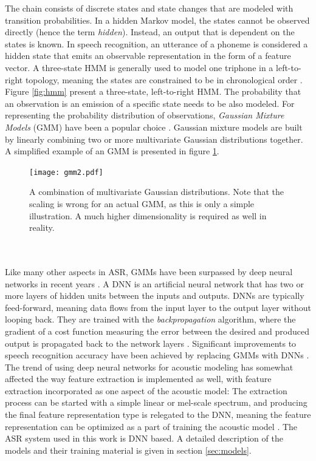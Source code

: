 \documentclass[english, 12pt, a4paper, pdftex, elec, utf8]{aaltothesis}
\begin{document}
The chain consists of discrete states and state changes that are modeled with transition probabilities. In a hidden Markov model, the states cannot be observed directly (hence the term \textit{hidden}). Instead, an output that is dependent on the states is known. In speech recognition, an utterance of a phoneme is considered a hidden state that emits an observable representation in the form of a feature vector. A three-state HMM is generally used to model one triphone in a left-to-right topology, meaning the states are constrained to be in chronological order \cite{kallasjoki2016}. Figure \ref{fig:hmm} present a three-state, left-to-right HMM. The probability that an observation is an emission of a specific state needs to be also modeled. For representing the probability distribution of observations, \textit{Gaussian Mixture Models} (GMM) have been a popular choice \cite{gales2008application, hinton2012deep}. Gaussian mixture models are built by linearly combining two or more multivariate Gaussian distributions together. A simplified example of an GMM is presented in figure \ref{fig:gmm}.
\begin{figure}[b]
	\centering
	\texttt{[image: gmm2.pdf]}
	\caption{A combination of multivariate Gaussian distributions. Note that the scaling is wrong for an actual GMM, as this is only a simple illustration. A much higher dimensionality is required as well in reality.}
	\label{fig:gmm} 
\end{figure} \\\\
Like many other aspects in ASR, GMMs have been surpassed by deep neural networks in recent years \cite{hinton2012deep}. A DNN is an artificial neural network that has two or more layers of hidden units between the inputs and outputs. DNNs are typically feed-forward, meaning data flows from the input layer to the output layer without looping back. They are trained with the \textit{backpropagation} algorithm, where the gradient of a cost function measuring the error between the desired and produced output is propagated back to the network layers \cite[p.~57--60]{yu2014automatic}. Significant improvements to speech recognition accuracy have been achieved by replacing GMMs with DNNs \cite{yu2014automatic, hinton2012deep, xiong2016achieving}. The trend of using deep neural networks for acoustic modeling has somewhat affected the way feature extraction is implemented as well, with feature extraction incorporated as one aspect of the acoustic model: The extraction process can be started with a simple linear or mel-scale spectrum, and producing the final feature representation type is relegated to the DNN, meaning the feature representation can be optimized as a part of training the acoustic model \cite{kallasjoki2016}. The ASR system used in this work is DNN based. A detailed description of the models and their training material is given in section \ref{sec:models}.
\end{document}
